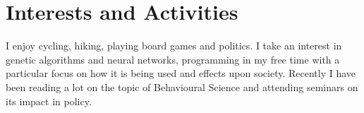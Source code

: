 \documentclass[a4paper,10pt]{article}
\begin{document}
\section{Interests and Activities}
I enjoy cycling, hiking, playing board games and politics. I take an interest in genetic algorithms and neural networks, programming in my free time with a particular focus on how it is being used and effects upon society. Recently I have been reading a lot on the topic of Behavioural Science and attending seminars on its impact in policy.\\
\end{document}
